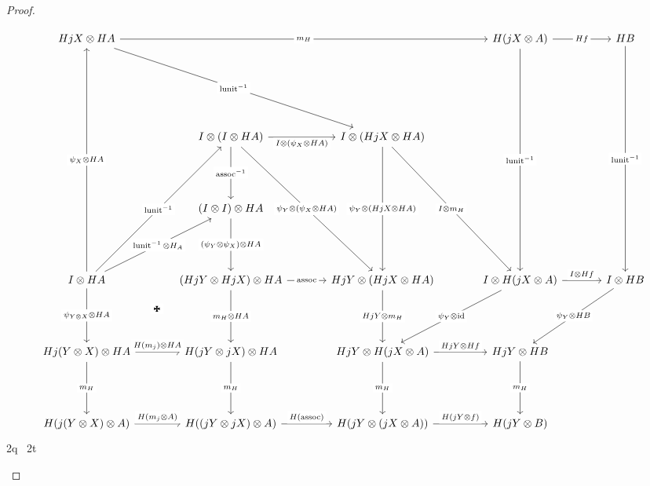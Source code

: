 \documentclass{article}
\begin{document}
\begin{proof}
  \begin{SidewaysFigure}
    \[
      \begin{tikzcd}[ampersand replacement=\&, row sep=48pt, column sep=36pt, labels={description}]
        HjX \tensor HA \arrow[rrr, "m_H"] \arrow[rrd, "\lunit\inv"]
          \&
            \&
              \& H(jX \tensor A) \arrow[r, "Hf"] \arrow[ddd, "\lunit\inv"]
                \& HB \arrow[ddd, "\lunit\inv"] \\[24pt]
          \& I \tensor (I \tensor HA) \arrow[r, "I\tensor(\psi_X\tensor HA)"' auto] \arrow[d, "\assoc\inv"] \arrow[ddr, "\psi_Y\tensor(\psi_X\tensor HA)"]
            \& I \tensor (HjX \tensor HA) \arrow[dd, "\psi_Y\tensor(HjX\tensor HA)"] \arrow[ddr, "I\tensor m_H"]
              \&
                \& \\
          \& (I \tensor I) \tensor HA \arrow[d, "(\psi_Y\tensor\psi_X)\tensor HA"]
            \&
              \&
                \& \\
        I \tensor HA \arrow[uuu, "\psi_X\tensor HA"] \arrow[uur, "\lunit\inv"] \arrow[ur, "\lunit\inv\tensor H_A" description] \arrow[d, "\psi_{Y\tensor X}\tensor HA"] \arrow[dr, phantom, "\kreuz" yshift=6pt]
          \& (HjY \tensor HjX) \tensor HA \arrow[r, "\assoc"] \arrow[d, "m_H\tensor HA"]
            \& HjY \tensor (HjX \tensor HA) \arrow[d, "HjY\tensor m_H"]
              \& I \tensor H(jX \tensor A) \arrow[dl, "\psi_Y\tensor\id"] \arrow[r, "I\tensor Hf" auto]
                \& I \tensor HB \arrow[dl, "\psi_Y\tensor HB"] \\
        Hj(Y \tensor X) \tensor HA \arrow[r, "H(m_j)\tensor HA" auto] \arrow[d, "m_H"]
          \& H(jY \tensor jX) \tensor HA \arrow[d, "m_H"]
            \& HjY \tensor H(jX \tensor A) \arrow[r, "HjY\tensor Hf" auto] \arrow[d, "m_H"]
              \& HjY \tensor HB \arrow[d, "m_H"]
                \& \\
        H(j(Y \tensor X) \tensor A) \arrow[r, "H(m_j\tensor A)" auto]
          \& H((jY \tensor jX) \tensor A) \arrow[r, "H(\assoc)" auto]
            \& H(jY \tensor (jX \tensor A)) \arrow[r, "H(jY\tensor f)" auto]
              \& H(jY \tensor B)
                \&
      \end{tikzcd}
      \]
    2q~
    2t
    \caption{A diagram showing that the functor $\F$ we defined in the proof of Proposition \ref{prop:cone} preserves composition.  
    The trapezium marked \kreuz{} commutes because $\psi$ is a dimonoidal natural transformation; commutativity of the other cells comes from the standard monoidal theory.}
  \end{SidewaysFigure}


\end{proof}
\end{document}
